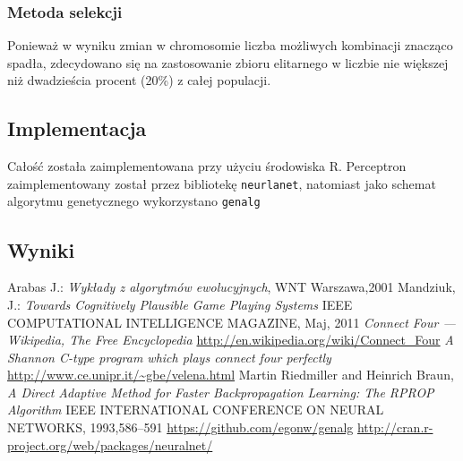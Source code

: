 \documentclass{llncs}
\begin{document}
\subsubsection{Metoda selekcji}
Ponieważ w wyniku zmian w chromosomie liczba możliwych kombinacji znacząco spadła, zdecydowano się na 
zastosowanie zbioru elitarnego w liczbie nie większej niż dwadzieścia procent (20\%) z całej populacji.

\subsection{Implementacja}
Całość została zaimplementowana przy użyciu środowiska R. Perceptron zaimplementowany został
przez bibliotekę \texttt{neurlanet}\cite{R:neuralnet}, natomiast jako schemat algorytmu genetycznego wykorzystano
\texttt{genalg}\cite{R:genalg}

\subsection{Wyniki}

%
%
\begin{thebibliography}{4}
%
Arabas J.:
\textsl{Wykłady z algorytmów ewolucyjnych}, WNT Warszawa,2001
Mandziuk, J.:
\textsl{Towards Cognitively Plausible Game Playing Systems}
IEEE COMPUTATIONAL INTELLIGENCE MAGAZINE, Maj, 2011
\textsl{Connect Four --- {W}ikipedia{,} The Free Encyclopedia}
\url{http://en.wikipedia.org/wiki/Connect_Four}
\textsl{A Shannon C-type program which plays connect four perfectly}
\url{http://www.ce.unipr.it/~gbe/velena.html}
Martin Riedmiller and Heinrich Braun,
\textsl{A Direct Adaptive Method for Faster Backpropagation Learning: The RPROP Algorithm}
IEEE INTERNATIONAL CONFERENCE ON NEURAL NETWORKS, 1993,586--591
\url{https://github.com/egonw/genalg}
\url{http://cran.r-project.org/web/packages/neuralnet/}
\end{thebibliography}
\end{document}
